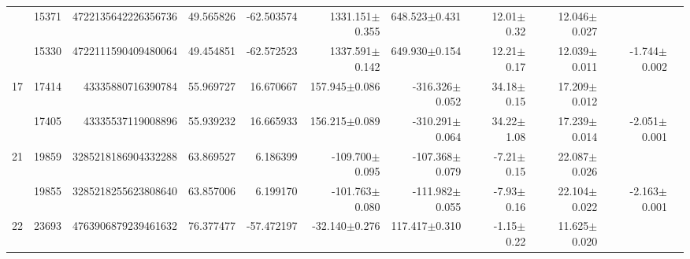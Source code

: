 \documentclass{ws-ijmpd}
\begin{document}
\begin{landscape}
\begin{longtable}{rrrrrrrrrrl}
\endlastfoot
  \hline 16 &   15371 &      4722135642226356736 &                    49.565826 &                   -62.503574 &               1331.151$\pm$0.355 &                648.523$\pm$0.431 &          12.01$\pm$  0.32 &        12.046$\pm$0.027 &                                           &                                                    \\
            &   15330 &      4722111590409480064 &                    49.454851 &                   -62.572523 &               1337.591$\pm$0.142 &                649.930$\pm$0.154 &          12.21$\pm$  0.17 &        12.039$\pm$0.011 &                          -1.744$\pm$0.002 &                                                    \\
  \hline 17 &   17414 &        43335880716390784 &                    55.969727 &                    16.670667 &                157.945$\pm$0.086 &               -316.326$\pm$0.052 &          34.18$\pm$  0.15 &        17.209$\pm$0.012 &                                           &                                                    \\
            &   17405 &        43335537119008896 &                    55.939232 &                    16.665933 &                156.215$\pm$0.089 &               -310.291$\pm$0.064 &          34.22$\pm$  1.08 &        17.239$\pm$0.014 &                          -2.051$\pm$0.001 &                                                    \\
  \hline 21 &   19859 &      3285218186904332288 &                    63.869527 &                     6.186399 &               -109.700$\pm$0.095 &               -107.368$\pm$0.079 &          -7.21$\pm$  0.15 &        22.087$\pm$0.026 &                                           &                                                    \\
            &   19855 &      3285218255623808640 &                    63.857006 &                     6.199170 &               -101.763$\pm$0.080 &               -111.982$\pm$0.055 &          -7.93$\pm$  0.16 &        22.104$\pm$0.022 &                          -2.163$\pm$0.001 &                                                    \\
  \hline 22 &   23693 &      4763906879239461632 &                    76.377477 &                   -57.472197 &                -32.140$\pm$0.276 &                117.417$\pm$0.310 &          -1.15$\pm$  0.22 &        11.625$\pm$0.020 &                                           &                                                    \\

\end{longtable}
\end{landscape}
\end{document}
